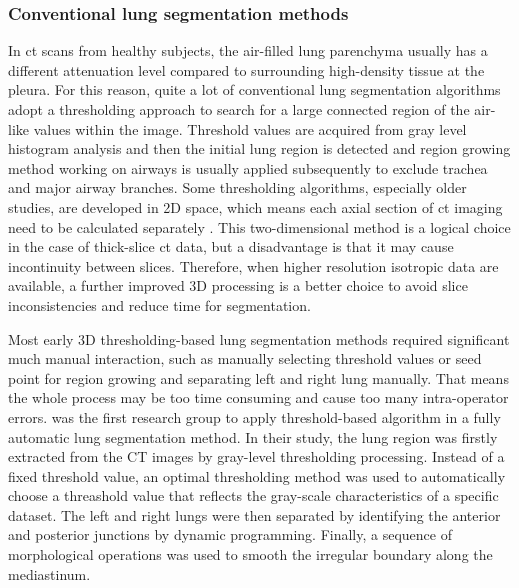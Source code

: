 \subsubsection{Conventional lung segmentation methods}
In \gls{ct} scans from healthy subjects, the air-filled lung parenchyma usually has a different attenuation level compared to surrounding high-density tissue at the pleura. For this reason, quite a lot of conventional lung segmentation algorithms adopt a thresholding approach to search for a large connected region of the air-like values within the image. Threshold values are acquired from gray level histogram analysis and then the initial lung region is detected and region growing method working on airways is usually applied subsequently to exclude trachea and major airway branches. Some thresholding algorithms, especially older studies, are developed in 2D space, which means each axial section of \gls{ct} imaging need to be calculated separately \citep{kalender1991semiautomatic,kemerink1998segmentation,leader2003automated,armato2004automated}. This two-dimensional method is a logical choice in the case of thick-slice \gls{ct} data, but a disadvantage is that it may cause incontinuity between slices. Therefore, when higher resolution isotropic data are available, a further improved 3D processing \citep{hu2001automatic,ukil2005smoothing,sun20063d} is a better choice to avoid slice inconsistencies and reduce time for segmentation.

Most early 3D thresholding-based lung segmentation methods \citep{keller1981automatic,hedlund1982two,hoffman1983noninvasive,hoffman1985effecta,hoffman1985effectb} required significant much manual interaction, such as manually selecting threshold values or seed point for region growing and separating left and right lung manually. That means the whole process may be too time consuming and cause too many intra-operator errors. \cite{hu2001automatic} was the first research group to apply threshold-based algorithm in a fully automatic lung segmentation method. In their study, the lung region was firstly extracted from the CT images by gray-level thresholding processing. Instead of a fixed threshold value, an optimal thresholding method was used to automatically choose a threashold value that reflects the gray-scale characteristics of a specific dataset. The left and right lungs were then separated by identifying the anterior and posterior junctions by dynamic programming. Finally, a sequence of morphological operations was used to smooth the irregular boundary along the mediastinum.

